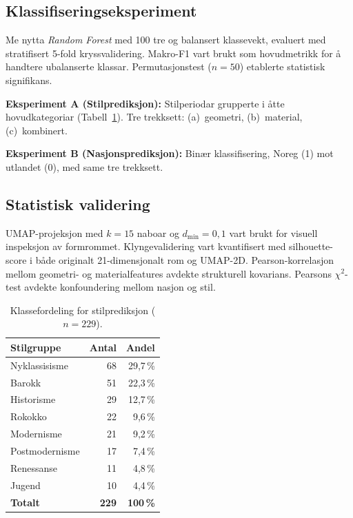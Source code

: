 \documentclass[12pt,a4paper]{article}
\begin{document}
\subsection{Klassifiseringseksperiment}

Me nytta \emph{Random Forest} \citep{breiman2001} med 100 tre og balansert klassevekt, evaluert med stratifisert 5-fold kryssvalidering. Makro-F1 vart brukt som hovudmetrikk for \aa{} handtere ubalanserte klassar. Permutasjonstest ($n=50$) etablerte statistisk signifikans.

\textbf{Eksperiment A (Stilprediksjon):} Stilperiodar grupperte i \aa{}tte hovudkategoriar (Tabell~\ref{tab:klassefordeling}). Tre trekksett: (a)~geometri, (b)~material, (c)~kombinert.

\textbf{Eksperiment B (Nasjonsprediksjon):} Bin\ae{}r klassifisering, Noreg (1) mot utlandet (0), med same tre trekksett.

\subsection{Statistisk validering}

UMAP-projeksjon \citep{mcinnes2018} med $k=15$ naboar og $d_\text{min}=0{,}1$ vart brukt for visuell inspeksjon av formrommet. Klyngevalidering vart kvantifisert med silhouette-score \citep{rousseeuw1987} i b\aa{}de originalt 21-dimensjonalt rom og UMAP-2D. Pearson-korrelasjon mellom geometri- og materialfeatures avdekte strukturell kovarians. Pearsons $\chi^2$-test avdekte konfoundering mellom nasjon og stil.

\begin{table}[H]
\centering
\caption{Klassefordeling for stilprediksjon ($n = 229$).}
\label{tab:klassefordeling}
\begin{tabular}{lrr}
\toprule
Stilgruppe & Antal & Andel \\
\midrule
Nyklassisisme   & 68 & 29{,}7\,\% \\
Barokk          & 51 & 22{,}3\,\% \\
Historisme      & 29 & 12{,}7\,\% \\
Rokokko         & 22 &  9{,}6\,\% \\
Modernisme      & 21 &  9{,}2\,\% \\
Postmodernisme  & 17 &  7{,}4\,\% \\
Renessanse      & 11 &  4{,}8\,\% \\
Jugend          & 10 &  4{,}4\,\% \\
\midrule
\textbf{Totalt} & \textbf{229} & \textbf{100\,\%} \\
\bottomrule
\end{tabular}
\end{table}
\end{document}
